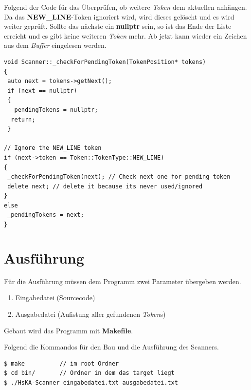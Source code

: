 \documentclass[
a4paper
]{scrreprt}
\begin{document}
	Folgend der Code für das Überprüfen, ob weitere \textit{Token} dem aktuellen anhängen. Da das \textbf{NEW\_LINE}-Token ignoriert wird, wird dieses gelöscht und es wird weiter geprüft. Sollte das nächste ein \textbf{nullptr} sein, so ist das Ende der Liste erreicht und es gibt keine weiteren \textit{Token} mehr. Ab jetzt kann wieder ein Zeichen aus dem \textit{Buffer} eingelesen werden.
	
	\begin{lstlisting}
void Scanner::_checkForPendingToken(TokenPosition* tokens)
{
 auto next = tokens->getNext();
 if (next == nullptr)
 {
  _pendingTokens = nullptr;
  return;
 }
	
// Ignore the NEW_LINE token
if (next->token == Token::TokenType::NEW_LINE)
{
 _checkForPendingToken(next); // Check next one for pending token
 delete next; // delete it because its never used/ignored
}
else
 _pendingTokens = next;
}
	\end{lstlisting}
	
	
	\section{Ausführung}
	Für die Ausführung müssen dem Programm zwei Parameter übergeben werden.
	
	\begin{enumerate}
		\item Eingabedatei (Sourcecode)
		\item Ausgabedatei (Aufistung aller gefundenen \textit{Token}s)
	\end{enumerate}
	
	Gebaut wird das Programm mit \textbf{Makefile}.
	
	Folgend die Kommandos für den Bau und die Ausführung des Scanners.
	
	\begin{lstlisting}
$ make 			// im root Ordner
$ cd bin/		// Ordner in dem das target liegt
$ ./HsKA-Scanner eingabedatei.txt ausgabedatei.txt
	\end{lstlisting}
	
	
\end{document}
